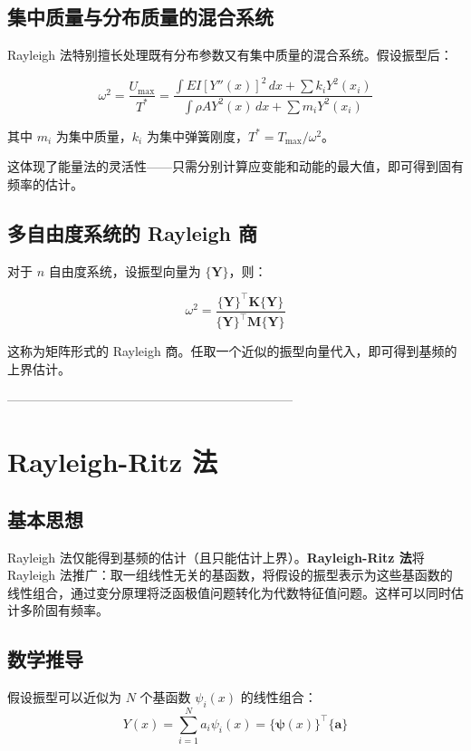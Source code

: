 \subsection{集中质量与分布质量的混合系统}

Rayleigh 法特别擅长处理既有分布参数又有集中质量的混合系统。假设振型后：

\begin{myformula}
\[
\omega^2 = \frac{U_{\max}}{T^*} = \frac{\int EI[Y''(x)]^2\,dx + \sum k_i Y^2(x_i)}{\int \rho A Y^2(x)\,dx + \sum m_i Y^2(x_i)}
\]
\end{myformula}

其中 $m_i$ 为集中质量，$k_i$ 为集中弹簧刚度，$T^* = T_{\max}/\omega^2$。

这体现了能量法的灵活性——只需分别计算应变能和动能的最大值，即可得到固有频率的估计。

\subsection{多自由度系统的 Rayleigh 商}

对于 $n$ 自由度系统，设振型向量为 $\{\mathbf{Y}\}$，则：

\[
\omega^2 = \frac{\{\mathbf{Y}\}^{\top}\mathbf{K}\{\mathbf{Y}\}}{\{\mathbf{Y}\}^{\top}\mathbf{M}\{\mathbf{Y}\}}
\]

这称为矩阵形式的 Rayleigh 商。任取一个近似的振型向量代入，即可得到基频的上界估计。

--------------------------------------------------------------------
\section{Rayleigh-Ritz 法}

\subsection{基本思想}

Rayleigh 法仅能得到基频的估计（且只能估计上界）。\textbf{Rayleigh-Ritz 法}将 Rayleigh 法推广：取一组线性无关的基函数，将假设的振型表示为这些基函数的线性组合，通过变分原理将泛函极值问题转化为代数特征值问题。这样可以同时估计多阶固有频率。

\subsection{数学推导}

假设振型可以近似为 $N$ 个基函数 $\psi_i(x)$ 的线性组合：
\[
Y(x) = \sum_{i=1}^{N} a_i \psi_i(x) = \{\bm{\psi}(x)\}^{\top}\{\mathbf{a}\}
\]

